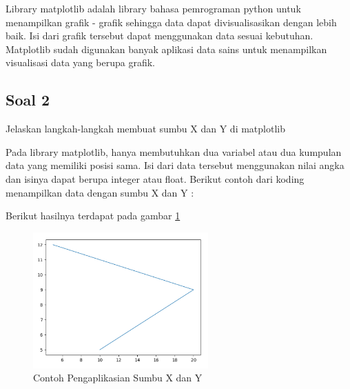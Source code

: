 Library matplotlib adalah library bahasa pemrograman python untuk menampilkan grafik - grafik sehingga data dapat divisualisasikan dengan lebih baik. Isi dari grafik tersebut dapat menggunakan data sesuai kebutuhan. Matplotlib sudah digunakan banyak aplikasi data sains untuk menampilkan visualisasi data yang berupa grafik. 

\subsection{Soal 2}
Jelaskan langkah-langkah membuat sumbu X dan Y di matplotlib

Pada library matplotlib, hanya membutuhkan dua variabel atau dua kumpulan data yang memiliki posisi sama. Isi dari data tersebut menggunakan nilai angka dan isinya dapat berupa integer atau float. Berikut contoh dari koding menampilkan data dengan sumbu X dan Y : 

Berikut hasilnya terdapat pada gambar \ref{Contoh_Soal2}
\begin{figure} [ht]
	\centerline{\includegraphics[width=0.6\textwidth]{figures/6/1174035/Teori/Soal2.png}}
	\caption{Contoh Pengaplikasian Sumbu X dan Y}
	\label{Contoh_Soal2}
\end{figure}

